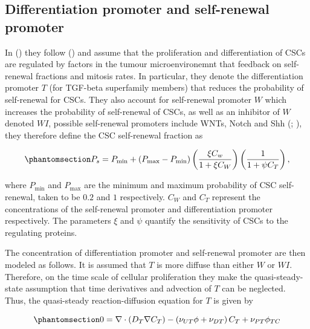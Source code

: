 \documentclass[
  letterpaper,
]{scrreprt}
\theoremstyle{definition}
\theoremstyle{remark}
\begin{document}
\subsection{Differentiation promoter and self-renewal
promoter}\label{differentiation-promoter-and-self-renewal-promoter}

In () they follow
() and assume that the
proliferation and differentiation of CSCs are regulated by factors in
the tumour microenvironemnt that feedback on self-renewal fractions and
mitosis rates. In particular, they denote the differentiation promoter
\(T\) (for TGF-beta superfamily members) that reduces the probability of
self-renewal for CSCs. They also account for self-renewal promoter \(W\)
which increases the probability of self-renewal of CSCs, as well as an
inhibitor of \(W\) denoted \(WI\), possible self-renewal promoters
include WNTs, Notch and Shh (; ), they therefore define the CSC self-renewal fraction as

\begin{equation}\phantomsection\label{eq-youssefpour-Ps}{
P_s = P_\text{min} + (P_\text{max} - P_\text{min}) \left( \frac{\xi C_w}{1 + \xi C_W} \right)\left( \frac{1}{1 + \psi C_T} \right),
}\end{equation}

where \(P_\text{min}\) and \(P_\text{max}\) are the minimum and maximum
probability of CSC self-renewal, taken to be \(0.2\) and \(1\)
respectively. \(C_W\) and \(C_T\) represent the concentrations of the
self-renewal promoter and differentiation promoter respectively. The
parameters \(\xi\) and \(\psi\) quantify the sensitivity of CSCs to the
regulating proteins.

The concentration of differentiation promoter and self-renewal promoter
are then modeled as follows. It is assumed that \(T\) is more diffuse
than either \(W\) or \(WI\). Therefore, on the time scale of cellular
proliferation they make the quasi-steady-state assumption that time
derivatives and advection of \(T\) can be neglected. Thus, the
quasi-steady reaction-diffusion equation for \(T\) is given by

\begin{equation}\phantomsection\label{eq-youssefpour-T}{
0 = \nabla \cdot (D_T \nabla C_T) - \left( \nu_{UT} \phi + \nu_{DT} \right) C_T + \nu_{PT}\phi_{TC}
}\end{equation}
\end{document}
